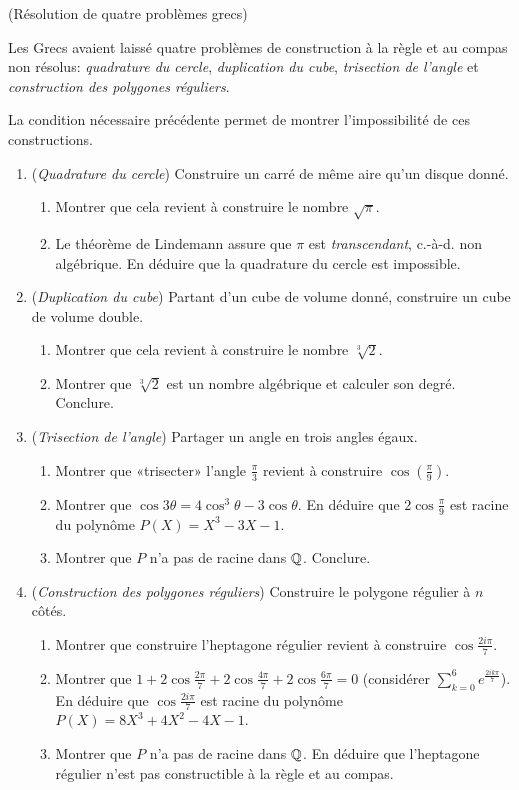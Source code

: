 \documentclass[a4paper,11pt,reqno]{amsart}
\begin{document}
\begin{exo}  (Résolution de quatre problèmes grecs)

  Les Grecs avaient laissé quatre problèmes de construction à la règle et au compas non résolus: \emph{quadrature du cercle}, \emph{duplication du cube}, \emph{trisection de l'angle} et \emph{construction des polygones réguliers}.

  La condition nécessaire précédente permet de montrer l'impossibilité de ces constructions.
  \begin{enumerate}
    \item (\emph{Quadrature du cercle}) Construire un carré de même aire qu'un disque donné.
    \begin{enumerate}
      \item Montrer que cela revient à construire le nombre $\sqrt{\pi}$.
      \item Le théorème de Lindemann assure que $\pi$ est \emph{transcendant}, c.-à-d. non algébrique. En déduire que la quadrature du cercle est impossible.
    \end{enumerate}
    \item (\emph{Duplication du cube}) Partant d'un cube de volume donné, construire un cube de volume double.
    \begin{enumerate}
      \item Montrer que cela revient à construire le nombre $\sqrt[3]{2}$.
      \item Montrer que $\sqrt[3]{2}$ est un nombre algébrique et calculer son degré. Conclure.
    \end{enumerate}
    \item (\emph{Trisection de l'angle})  Partager un angle en trois angles égaux.
    \begin{enumerate}
      \item Montrer que «trisecter» l'angle $\frac{\pi}{3}$ revient à construire $\cos(\frac{\pi}{9})$.
      \item Montrer que $\cos 3\theta = 4 \cos^3 \theta -3 \cos \theta$. En déduire que $2 \cos \frac{\pi}{9}$ est racine du polynôme $P(X)=X^3-3X-1$.
      \item Montrer que $P$ n'a pas de racine dans $\mathbb{Q}$. Conclure.
    \end{enumerate}
    \item (\emph{Construction des polygones réguliers}) Construire le polygone régulier à $n$ côtés.
    \begin{enumerate}
      \item Montrer que construire l'heptagone régulier revient à construire $\cos\frac{2i\pi}{7}$.
      \item Montrer que $1+2\cos\frac{2\pi}{7}+2\cos\frac{4\pi}{7}+2\cos\frac{6\pi}{7}=0$ (considérer $\sum_{k=0}^6 e^{\frac{2ik\pi}{7}}$). En déduire que $\cos\frac{2i\pi}{7}$ est racine du polynôme $P(X)=8X^3+4X^2-4X-1$.
      \item Montrer que $P$ n'a pas de racine dans $\mathbb{Q}$. En déduire que l'heptagone régulier n'est pas constructible à la règle et au compas.
    \end{enumerate}
  \end{enumerate}
\end{exo}
\end{document}
